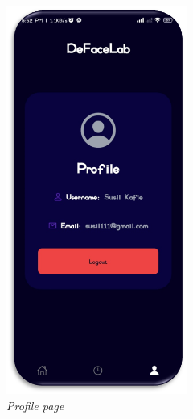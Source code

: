 \begin{figure}[ht]
    \centering
    \includegraphics[height= 5in]{img/profilev2.png}
    \caption{\textit{Profile page}}
\end{figure}